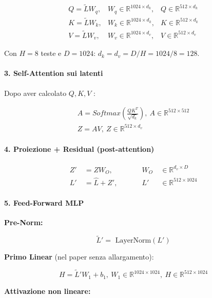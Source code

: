 \documentclass[
  11pt,
]{article}
\begin{document}
\[\begin{matrix}
Q = \widetilde{L}W_{q}, & W_{q} \in \mathbb{R}^{1024 \times d_k}, & Q \in \mathbb{R}^{512 \times d_k} \\
K = \widetilde{L}W_{k}, & W_{k} \in \mathbb{R}^{1024 \times d_k}, & K \in \mathbb{R}^{512 \times d_k} \\
V = \widetilde{L}W_{v}, & W_{v} \in \mathbb{R}^{1024 \times d_v}, & V \in \mathbb{R}^{512 \times d_v}
\end{matrix}\]

Con $H=8$ teste e $D=1024$: $d_k = d_v = D/H = 1024/8 = 128$.

\paragraph{3. \textbf{Self-Attention sui latenti}}

Dopo aver calcolato \(Q,K,V\) :

\[\begin{matrix}
A = Softmax\left( \frac{QK^{T}}{\sqrt{d_k}} \right),\ A \in \mathbb{R}^{512 \times 512} \\
Z = AV,\ Z \in \mathbb{R}^{512 \times d_v}
\end{matrix}\]

\paragraph{4. \textbf{Proiezione + Residual (post-attention)}}

\[\begin{matrix}
Z' & \  = ZW_{O}, & \ \ \ \ \ \ \ \  & W_{O} & \  \in \mathbb{R}^{d_v \times D} \\
L' & \  = \widehat{L} + Z', & \ \ \ \ \ \ \ \  & L' & \  \in \mathbb{R}^{512 \times 1024}
\end{matrix}\]

\paragraph{5. \textbf{Feed-Forward MLP}}

\textbf{Pre-Norm:}

\[{\widetilde{L}}' = \text{ LayerNorm}\left( L' \right)\]

\textbf{Primo Linear} (nel paper senza allargamento):

\[H = {\widetilde{L}}'W_{1} + b_{1},\ W_{1} \in \mathbb{R}^{1024 \times 1024},\ H \in \mathbb{R}^{512 \times 1024}\]

\textbf{Attivazione non lineare:}
\end{document}
